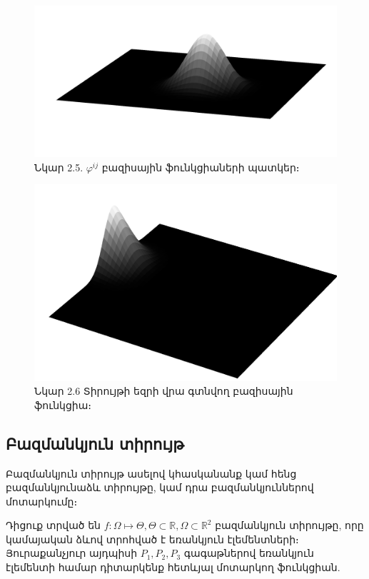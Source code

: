 \documentclass[fleqn, bachelor,subf,12pt,notitlepage]{article}
\begin{document}
\newpage
\begin{figure}[h!]
\centering
\includegraphics[width=1.0\textwidth]{images/two_dimensional_basis}
\captionsetup{labelformat=empty}
\caption{\hfill Նկար 2.5. $\varphi^{ij}$ բազիսային ֆունկցիաների պատկեր։}
\end{figure}
\begin{figure}[h!]
\centering
\includegraphics[width=1.0\textwidth]{images/two_dimensional_basis_1}
\captionsetup{labelformat=empty}
\caption{\hfill Նկար 2.6 Տիրույթի եզրի վրա գտնվող բազիսային ֆունկցիա։}
\end{figure}

\newpage
\subsection*{Բազմանկյուն տիրույթ}

Բազմանկյուն տիրույթ ասելով կհասկանանք կամ հենց բազմանկյունաձև տիրույթը, կամ դրա բազմանկյուններով մոտարկումը։ 

Դիցուք տրված են $f:\Omega\mapsto \Theta, \Theta \subset \mathbb{R}, \Omega \subset \mathbb{R}^{2} $ բազմանկյուն տիրույթը, որը կամայական ձևով տրոհված է եռանկյուն էլեմենտների։ Յուրաքանչյուր այդպիսի $P_{1}, P_{2}, P_{3}$ գագաթներով եռանկյուն էլեմենտի համար դիտարկենք հետևյալ մոտարկող ֆունկցիան.
\end{document}
